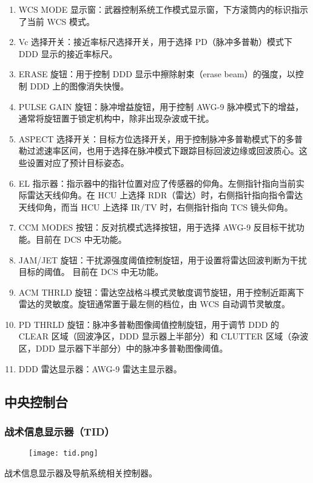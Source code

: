 \begin{enumerate}
  \item WCS MODE 显示窗：武器控制系统工作模式显示窗，下方滚筒内的标识指示了当前 WCS 模式。
  \item Vc 选择开关：接近率标尺选择开关，用于选择 PD（脉冲多普勒）模式下 DDD 显示的接近率标尺。
  \item ERASE 旋钮：用于控制 DDD 显示中擦除射束（erase beam）的强度，以控制 DDD 上的图像消失快慢。
  \item PULSE GAIN 旋钮：脉冲增益旋钮，用于控制 AWG-9 脉冲模式下的增益，通常将旋钮置于锁定机构中，除非出现杂波或干扰。
  \item ASPECT 选择开关：目标方位选择开关，用于控制脉冲多普勒模式下的多普勒过滤速率区间，也用于选择在脉冲模式下跟踪目标回波边缘或回波质心。这些设置对应了预计目标姿态。
  \item EL 指示器：指示器中的指针位置对应了传感器的仰角。左侧指针指向当前实际雷达天线仰角。在 HCU 上选择 RDR（雷达）时，右侧指针指向指令雷达天线仰角，而当 HCU 上选择 IR/TV 时，右侧指针指向 TCS 镜头仰角。
  \item CCM MODES 按钮：反对抗模式选择按钮，用于选择 AWG-9 反目标干扰功能。目前在 DCS 中无功能。
  \item JAM/JET 旋钮：干扰源强度阈值控制旋钮，用于设置将雷达回波判断为干扰目标的阈值。 目前在 DCS 中无功能。
  \item ACM THRLD 旋钮：雷达空战格斗模式灵敏度调节旋钮，用于控制近距离下雷达的灵敏度。旋钮通常置于最左侧的档位，由 WCS 自动调节灵敏度。
  \item PD THRLD 旋钮：脉冲多普勒图像阈值控制旋钮，用于调节 DDD 的 CLEAR 区域（回波净区，DDD 显示器上半部分）和 CLUTTER 区域（杂波区，DDD 显示器下半部分）中的脉冲多普勒图像阈值。
  \item DDD 雷达显示器：AWG-9 雷达主显示器。
\end{enumerate}

\subsection{中央控制台}

\subsubsection{战术信息显示器（TID）}
\begin{figure}[htb]
  \center
  \texttt{[image: tid.png]}
\end{figure}
战术信息显示器及导航系统相关控制器。

